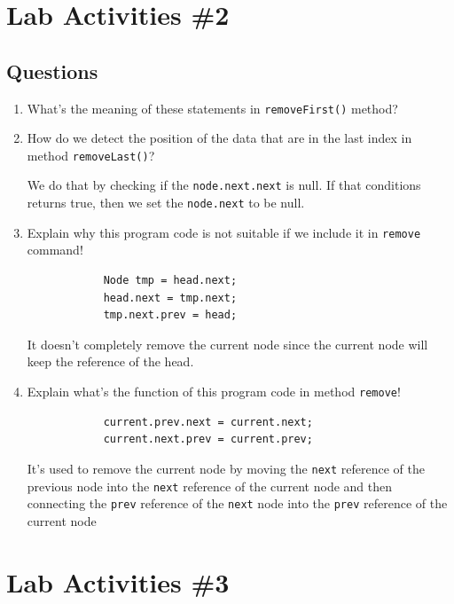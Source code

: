 \documentclass[12pt,titlepage]{article}
\begin{document}
\section*{Lab Activities \#2}
\subsection*{Questions}
\begin{enumerate}
    \item {
        What's the meaning of these statements in \texttt{removeFirst()} method?
    }
    \item {
        How do we detect the position of the data that are in the last index in method \texttt{removeLast()}?
        
        We do that by checking if the \texttt{node.next.next} is null. If that conditions returns true,
        then we set the \texttt{node.next} to be null.
    }
    \item {
        Explain why this program code is not suitable if we include it in \texttt{remove} command!

        \begin{verbatim}
            Node tmp = head.next;
            head.next = tmp.next;
            tmp.next.prev = head;
        \end{verbatim}

        It doesn't completely remove the current node since the current node will keep the reference of the head.
    }
    \item {
        Explain what's the function of this program code in method \texttt{remove}!

        \begin{verbatim}
            current.prev.next = current.next;
            current.next.prev = current.prev;
        \end{verbatim}

        It's used to remove the current node by moving the \texttt{next} reference of the previous node into
        the \texttt{next} reference of the current node and then connecting the \texttt{prev} reference of the
        \texttt{next} node into the \texttt{prev} reference of the current node
    }
\end{enumerate}

\section*{Lab Activities \#3}
\end{document}
